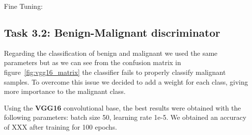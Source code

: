\documentclass[11pt,a4paper,oneside]{article}
\begin{document}
Fine Tuning:\\

\clearpage

\subsection{Task 3.2: Benign-Malignant discriminator}
Regarding the classification of benign and malignant we used the same parameters but as we can see from the confusion matrix in figure~\ref{fig:vgg16_matrix} the classifier fails to properly classify malignant samples. To overcome this issue we decided to add a weight for each class, giving more importance to the malignant class. 

Using the \textbf{VGG16} convolutional base, the best results were obtained with the following parameters: batch size 50, learning rate 1e-5. We obtained an accuracy of XXX after training for 100 epochs. 
\end{document}

